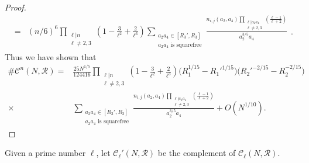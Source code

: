 \documentclass[table]{amsart}
\numberwithin{equation}{section}
\begin{document}
\begin{proof}
\[\begin{split}
    =& (n/6)^6\prod_{\substack{\ell|n\\\ell\neq 2,3}}\left(1-\frac{3}{\ell^2}+\frac{2}{\ell^3}\right)\sum_{\substack{a_2a_4\in [R_3', R_3]\\
    a_2a_4\text{ is squarefree}}}\frac{n_{i,j} (a_2,a_4)\prod_{\substack{\ell|a_2a_4\\\ell\neq 2,3}}\left(\frac{\ell-1}{\ell+2}\right)}{a_2^{3/5} a_4}
\end{split}.\]
Thus we have shown that 
\[\begin{split}\#\mathcal{C}^n(N,\mathscr{R})=&\frac{25 N^{1/5}}{124416}\prod_{\substack{\ell|n\\\ell\neq 2,3}}\left(1-\frac{3}{\ell^2}+\frac{2}{\ell^3}\right)
\bigl(R_1^{1/15}-R_1'^{1/15}\bigr)
\bigl(R_2'^{-2/15}-R_2^{-2/15}\bigr) \\
\times& \sum_{\substack{a_2a_4\in [R_3', R_3]\\
    a_2a_4\text{ is squarefree}}}\frac{n_{i,j}(a_2,a_4)\prod_{\substack{\ell|a_2a_4\\ \ell\neq 2,3}}\left(\frac{\ell-1}{\ell+2}\right)}{a_2^{3/5} a_4}+
O\!\left(N^{1/10}\right).\end{split}\]
\end{proof}
Given a prime number $\ell$, let $\mathcal{C}_\ell'(N,\mathscr{R})$ be the complement of $\mathcal{C}_\ell(N,\mathscr{R})$. 
\end{document}
